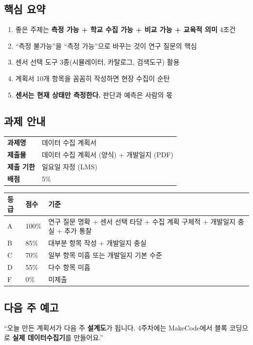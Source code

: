 \documentclass[11pt, a4paper]{article}
\begin{document}
\subsection{핵심 요약}

\begin{keybox}[핵심 5가지]
\begin{enumerate}[nosep]
  \item 좋은 주제는 \textbf{측정 가능 + 학교 수집 가능 + 비교 가능 + 교육적 의미} 4조건
  \item ``측정 불가능''을 ``측정 가능''으로 바꾸는 것이 연구 질문의 핵심
  \item 센서 선택 도구 3종(시뮬레이터, 카탈로그, 검색도구) 활용
  \item 계획서 10개 항목을 꼼꼼히 작성하면 현장 수집이 순탄
  \item \textbf{센서는 현재 상태만 측정한다.} 판단과 예측은 사람의 몫
\end{enumerate}
\end{keybox}

\subsection{과제 안내}

\begin{bluebox}[과제]
\begin{tabularx}{\textwidth}{L{3cm}X}
\textbf{과제명} & 데이터 수집 계획서 \\
\textbf{제출물} & 데이터 수집 계획서 (양식) + 개발일지 (PDF) \\
\textbf{제출 기한} & 일요일 자정 (LMS) \\
\textbf{배점} & 5\% \\
\end{tabularx}
\end{bluebox}

\begin{center}
\begin{tabularx}{0.92\textwidth}{C{0.8cm}C{1cm}X}
\toprule
\textbf{등급} & \textbf{점수} & \textbf{기준} \\
\midrule
A & 100\% & 연구 질문 명확 + 센서 선택 타당 + 수집 계획 구체적 + 개발일지 충실 + 추가 통찰 \\
B & 85\% & 대부분 항목 작성 + 개발일지 충실 \\
C & 70\% & 일부 항목 미흡 또는 개발일지 기본 수준 \\
D & 55\% & 다수 항목 미흡 \\
F & 0\% & 미제출 \\
\bottomrule
\end{tabularx}
\end{center}

\subsection{다음 주 예고}

\begin{tipbox}[교수자 멘트]
``오늘 만든 계획서가 다음 주 \textbf{설계도}가 됩니다. 4주차에는 MakeCode에서 블록 코딩으로 \textbf{실제 데이터수집기}를 만들어요.''
\end{tipbox}
\end{document}
